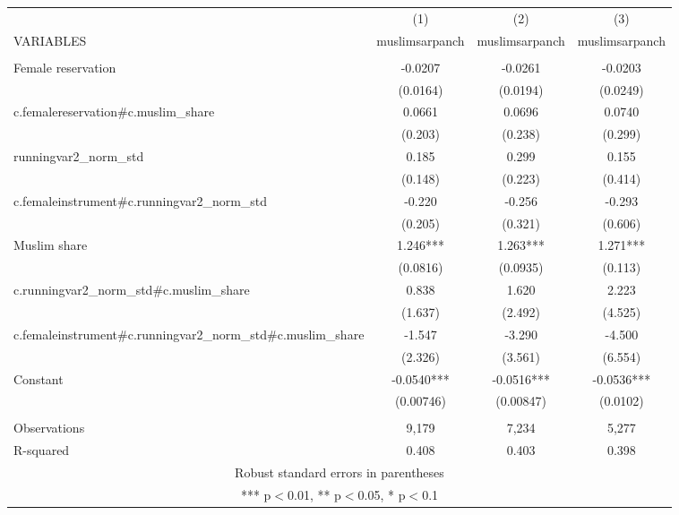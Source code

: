 \begin{tabular}{lccc} \hline
 & (1) & (2) & (3) \\
VARIABLES & muslimsarpanch & muslimsarpanch & muslimsarpanch \\ \hline
 &  &  &  \\
Female reservation & -0.0207 & -0.0261 & -0.0203 \\
 & (0.0164) & (0.0194) & (0.0249) \\
c.femalereservation\#c.muslim\_share & 0.0661 & 0.0696 & 0.0740 \\
 & (0.203) & (0.238) & (0.299) \\
runningvar2\_norm\_std & 0.185 & 0.299 & 0.155 \\
 & (0.148) & (0.223) & (0.414) \\
c.femaleinstrument\#c.runningvar2\_norm\_std & -0.220 & -0.256 & -0.293 \\
 & (0.205) & (0.321) & (0.606) \\
Muslim share & 1.246*** & 1.263*** & 1.271*** \\
 & (0.0816) & (0.0935) & (0.113) \\
c.runningvar2\_norm\_std\#c.muslim\_share & 0.838 & 1.620 & 2.223 \\
 & (1.637) & (2.492) & (4.525) \\
c.femaleinstrument\#c.runningvar2\_norm\_std\#c.muslim\_share & -1.547 & -3.290 & -4.500 \\
 & (2.326) & (3.561) & (6.554) \\
Constant & -0.0540*** & -0.0516*** & -0.0536*** \\
 & (0.00746) & (0.00847) & (0.0102) \\
 &  &  &  \\
Observations & 9,179 & 7,234 & 5,277 \\
 R-squared & 0.408 & 0.403 & 0.398 \\ \hline
\multicolumn{4}{c}{ Robust standard errors in parentheses} \\
\multicolumn{4}{c}{ *** p$<$0.01, ** p$<$0.05, * p$<$0.1} \\
\end{tabular}
